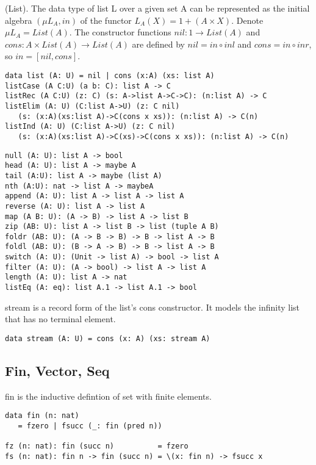 \begin{definition} (List).
The data type of list L over a given set A can be represented
as the initial algebra $(\mu L_A, in)$ of the functor $L_A(X) = 1 + (A \times X)$.
Denote $\mu L_A = List(A)$. The constructor functions
$nil: 1 \rightarrow List(A)$ and $cons: A \times List(A) \rightarrow
List(A)$ are defined by $nil = in \circ inl$ and $cons = in \circ inr$,
so $in = [nil,cons]$.
\begin{lstlisting}[mathescape=true]
data list (A: U) = nil | cons (x:A) (xs: list A)
listCase (A C:U) (a b: C): list A -> C
listRec (A C:U) (z: C) (s: A->list A->C->C): (n:list A) -> C
listElim (A: U) (C:list A->U) (z: C nil)
   (s: (x:A)(xs:list A)->C(cons x xs)): (n:list A) -> C(n)
listInd (A: U) (C:list A->U) (z: C nil)
   (s: (x:A)(xs:list A)->C(xs)->C(cons x xs)): (n:list A) -> C(n)
\end{lstlisting}
\begin{lstlisting}[mathescape=true]
null (A: U): list A -> bool
head (A: U): list A -> maybe A
tail (A:U): list A -> maybe (list A)
nth (A:U): nat -> list A -> maybeA
append (A: U): list A -> list A -> list A
reverse (A: U): list A -> list A
map (A B: U): (A -> B) -> list A -> list B
zip (AB: U): list A -> list B -> list (tuple A B)
foldr (AB: U): (A -> B -> B) -> B -> list A -> B
foldl (AB: U): (B -> A -> B) -> B -> list A -> B
switch (A: U): (Unit -> list A) -> bool -> list A
filter (A: U): (A -> bool) -> list A -> list A
length (A: U): list A -> nat
listEq (A: eq): list A.1 -> list A.1 -> bool
\end{lstlisting}
\end{definition}

stream is a record form of the list's cons constructor. It models the infinity list that has no terminal element.
\begin{lstlisting}
data stream (A: U) = cons (x: A) (xs: stream A)
\end{lstlisting}

\subsection{Fin, Vector, Seq}

fin is the inductive defintion of set with finite elements.
\begin{lstlisting}
data fin (n: nat)
   = fzero | fsucc (_: fin (pred n))

fz (n: nat): fin (succ n)          = fzero
fs (n: nat): fin n -> fin (succ n) = \(x: fin n) -> fsucc x
\end{lstlisting}

